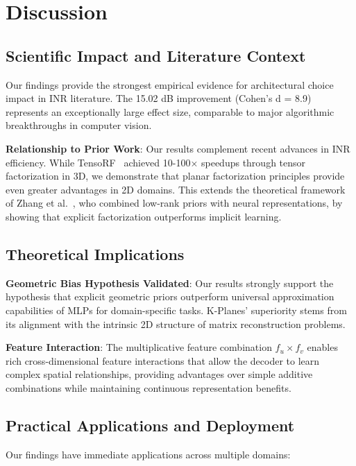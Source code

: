 \documentclass{article}
\begin{document}
\section{Discussion}

\subsection{Scientific Impact and Literature Context}

Our findings provide the strongest empirical evidence for architectural choice impact in INR literature. The 15.02 dB improvement (Cohen's d = 8.9) represents an exceptionally large effect size, comparable to major algorithmic breakthroughs in computer vision.

\textbf{Relationship to Prior Work}: Our results complement recent advances in INR efficiency. While TensoRF~\cite{chen2022tensorf} achieved 10-100× speedups through tensor factorization in 3D, we demonstrate that planar factorization principles provide even greater advantages in 2D domains. This extends the theoretical framework of Zhang et al.~\cite{zhang2025lorein}, who combined low-rank priors with neural representations, by showing that explicit factorization outperforms implicit learning.

\subsection{Theoretical Implications}

\textbf{Geometric Bias Hypothesis Validated}: Our results strongly support the hypothesis that explicit geometric priors outperform universal approximation capabilities of MLPs for domain-specific tasks. K-Planes' superiority stems from its alignment with the intrinsic 2D structure of matrix reconstruction problems.

\textbf{Feature Interaction}: The multiplicative feature combination $f_u \times f_v$ enables rich cross-dimensional feature interactions that allow the decoder to learn complex spatial relationships, providing advantages over simple additive combinations while maintaining continuous representation benefits.

\subsection{Practical Applications and Deployment}

Our findings have immediate applications across multiple domains:
\end{document}
